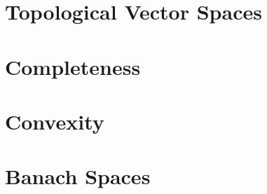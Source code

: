 \chapter{Topological Vector Spaces}

\chapter{Completeness}

\chapter{Convexity}

\chapter{Banach Spaces}
